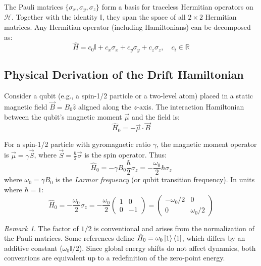 \documentclass[11pt,a4paper]{article}
\theoremstyle{definition}
\theoremstyle{remark}
\newtheorem{remark}{Remark}[section]
\newcommand{\paulix}{\sigma_x}
\newcommand{\pauliy}{\sigma_y}
\newcommand{\pauliz}{\sigma_z}
\newcommand{\identity}{\mathbb{I}}
\newcommand{\hilbert}{\mathcal{H}}
\newcommand{\RR}{\mathbb{R}}
\begin{document}
The Pauli matrices $\{\paulix, \pauliy, \pauliz\}$ form a basis for traceless Hermitian operators on $\hilbert$. Together with the identity $\identity$, they span the space of all $2 \times 2$ Hermitian matrices. Any Hermitian operator (including Hamiltonians) can be decomposed as:
\begin{equation}
\hat{H} = c_0 \identity + c_x \paulix + c_y \pauliy + c_z \pauliz, \quad c_i \in \RR
\end{equation}

\subsection{Physical Derivation of the Drift Hamiltonian}

Consider a qubit (e.g., a spin-1/2 particle or a two-level atom) placed in a static magnetic field $\vec{B} = B_0 \hat{z}$ aligned along the $z$-axis. The interaction Hamiltonian between the qubit's magnetic moment $\vec{\mu}$ and the field is:
\begin{equation}
\hat{H}_0 = -\vec{\mu} \cdot \vec{B}
\end{equation}

For a spin-1/2 particle with gyromagnetic ratio $\gamma$, the magnetic moment operator is $\vec{\mu} = \gamma \vec{S}$, where $\vec{S} = \frac{\hbar}{2} \vec{\sigma}$ is the spin operator. Thus:
\begin{equation}
\hat{H}_0 = -\gamma B_0 \frac{\hbar}{2} \sigma_z = -\frac{\omega_0}{2} \hbar \sigma_z
\end{equation}
where $\omega_0 = \gamma B_0$ is the \emph{Larmor frequency} (or qubit transition frequency). In units where $\hbar = 1$:
\begin{equation}
\hat{H}_0 = -\frac{\omega_0}{2} \sigma_z = -\frac{\omega_0}{2} \begin{pmatrix} 1 & 0 \\ 0 & -1 \end{pmatrix}
= \begin{pmatrix} -\omega_0/2 & 0 \\ 0 & \omega_0/2 \end{pmatrix}
\label{eq:drift_hamiltonian}
\end{equation}

\begin{remark}
The factor of $1/2$ is conventional and arises from the normalization of the Pauli matrices. Some references define $\hat{H}_0 = \omega_0 \ket{1}\bra{1}$, which differs by an additive constant ($\omega_0 \identity / 2$). Since global energy shifts do not affect dynamics, both conventions are equivalent up to a redefinition of the zero-point energy.
\end{remark}
\end{document}

